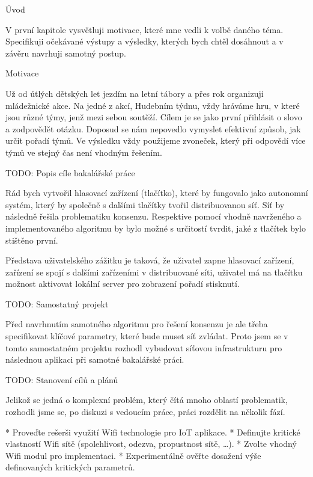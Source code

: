 
\def\ctustyle{{\ssr CTUstyle}}
\def\ttb{\tt\char`\\} %

\chap Úvod

V první kapitole vysvětluji motivace, které mne vedli k volbě daného téma. Specifikuji očekávané výstupy a výsledky, kterých bych chtěl dosáhnout a v závěru navrhuji samotný postup.

\sec Motivace

Už od útlých dětských let jezdím na letní tábory a přes rok organizuji mládežnické akce. Na jedné z akcí, Hudebním týdnu, vždy hráváme hru, v které jsou různé týmy, jenž mezi sebou soutěží. Cílem je se jako první přihlásit o slovo a zodpovědět otázku. Doposud se nám nepovedlo vymyslet efektivní způsob, jak určit pořadí týmů. Ve výsledku vždy použijeme zvoneček, který při odpovědí více týmů ve stejný čas není vhodným řešením.


\sec TODO: Popis cíle bakalářské práce

Rád bych vytvořil hlasovací zařízení (tlačítko), které by fungovalo jako autonomní systém, který by společně s dalšími tlačítky tvořil distribuovanou síť. Síť by následně řešila problematiku konsenzu. Respektive pomocí vhodně navrženého a implementovaného algoritmu by bylo možné s určitostí tvrdit, jaké z tlačítek bylo stištěno první. 

Představa uživatelského zážitku je taková, že uživatel zapne hlasovací zařízení, zařízení se spojí s dalšími zařízeními v distribuované síti, uživatel má na tlačítku možnost aktivovat lokální server pro zobrazení pořadí stisknutí.

\sec TODO: Samostatný projekt

Před navrhnutím samotného algoritmu pro řešení konsenzu je ale třeba specifikovat klíčové parametry, které bude muset síť zvládat. Proto jsem se v tomto samostatném projektu rozhodl vybudovat síťovou infrastrukturu pro následnou aplikaci při samotné bakalářské práci. 


\sec TODO: Stanovení cílů a plánů

Jelikož se jedná o komplexní problém, který čítá mnoho oblastí problematik, rozhodli jsme se, po diskuzi s vedoucím práce, práci rozdělit na několik fází.


\begitems
* Proveďte rešerši využití Wifi technologie pro IoT aplikace.
* Definujte kritické vlastností Wifi sítě (spolehlivost, odezva, propustnost sítě, …).
* Zvolte vhodný Wifi modul pro implementaci.
* Experimentálně ověřte dosažení výše definovaných kritických parametrů.
